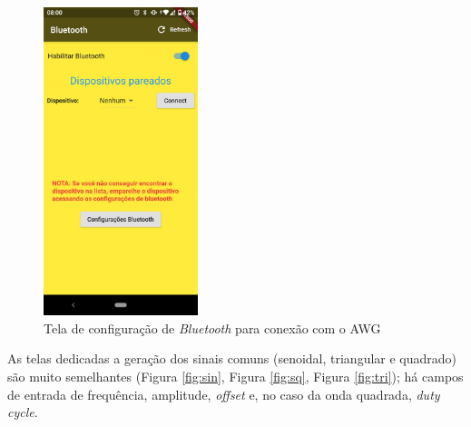 \documentclass[12pt,a4paper]{book}
\begin{document}
\begin{figure}[hbt!]
    \centering    
    \includegraphics[width=0.4\textwidth]{figs/bt.png}
    \caption{Tela de configuração de \textit{Bluetooth} para conexão com o AWG}
    \label{fig:bluetooth}
\end{figure}

As telas dedicadas a geração dos sinais comuns (senoidal, triangular e quadrado) são muito semelhantes (Figura \ref{fig:sin}, Figura \ref{fig:sq}, Figura \ref{fig:tri}); há campos de entrada de frequência, amplitude, \textit{offset} e, no caso da onda quadrada, \textit{duty cycle}.
\end{document}
